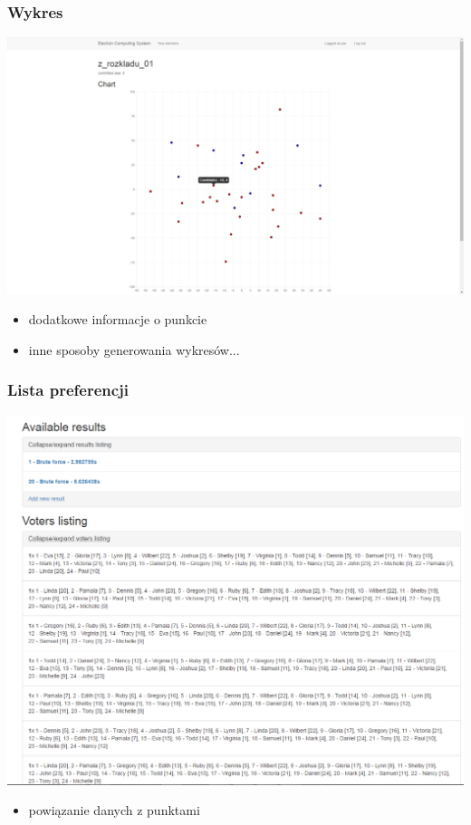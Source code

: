 \documentclass{beamer}
\begin{document}
\begin{frame}
\frametitle{Wykres}
\includegraphics[height=0.5\paperheight]{screenshots/18_wykres.png}
\begin{itemize}
\item dodatkowe informacje o punkcie
\item inne sposoby generowania wykresów...
\end{itemize}
\end{frame}
\begin{frame}
\frametitle{Lista preferencji}
\includegraphics[height=0.5\paperheight]{screenshots/19_szczegoly.png}
\begin{itemize}
\item powiązanie danych z punktami
\end{itemize}
\end{frame}
\end{document}
